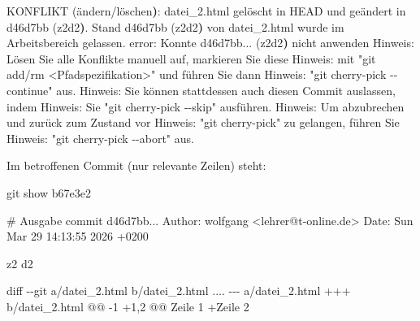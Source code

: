 \documentclass[
  ngerman,
  letterpaper,
  DIV=11]{scrreprt}
\newenvironment{Shaded}{\begin{snugshade}}{\end{snugshade}}
\newcommand{\AttributeTok}[1]{\textcolor[rgb]{0.40,0.45,0.13}{#1}}
\newcommand{\BuiltInTok}[1]{\textcolor[rgb]{0.00,0.23,0.31}{#1}}
\newcommand{\CommentTok}[1]{\textcolor[rgb]{0.37,0.37,0.37}{#1}}
\newcommand{\ErrorTok}[1]{\textcolor[rgb]{0.68,0.00,0.00}{#1}}
\newcommand{\ExtensionTok}[1]{\textcolor[rgb]{0.00,0.23,0.31}{#1}}
\newcommand{\FunctionTok}[1]{\textcolor[rgb]{0.28,0.35,0.67}{#1}}
\newcommand{\KeywordTok}[1]{\textcolor[rgb]{0.00,0.23,0.31}{\textbf{#1}}}
\newcommand{\NormalTok}[1]{\textcolor[rgb]{0.00,0.23,0.31}{#1}}
\newcommand{\OperatorTok}[1]{\textcolor[rgb]{0.37,0.37,0.37}{#1}}
\newcommand{\StringTok}[1]{\textcolor[rgb]{0.13,0.47,0.30}{#1}}
\begin{document}
\begin{Shaded}
\begin{Highlighting}[]
\ExtensionTok{KONFLIKT} \ErrorTok{(}\ExtensionTok{ändern/löschen}\KeywordTok{)}\BuiltInTok{:}\NormalTok{ datei\_2.html gelöscht in HEAD und }
\ExtensionTok{geändert}\NormalTok{ in d46d7bb }\ErrorTok{(}\ExtensionTok{z2d2}\KeywordTok{)}\BuiltInTok{.}\NormalTok{ Stand d46d7bb }\ErrorTok{(}\ExtensionTok{z2d2}\KeywordTok{)} \ExtensionTok{von}\NormalTok{ datei\_2.html }
\ExtensionTok{wurde}\NormalTok{ im Arbeitsbereich gelassen.}
\ExtensionTok{error:}\NormalTok{ Konnte d46d7bb... }\ErrorTok{(}\ExtensionTok{z2d2}\KeywordTok{)} \ExtensionTok{nicht}\NormalTok{ anwenden}
\ExtensionTok{Hinweis:}\NormalTok{ Lösen Sie alle Konflikte manuell auf, markieren Sie diese }
\ExtensionTok{Hinweis:}\NormalTok{ mit }\StringTok{"git add/rm \textless{}Pfadspezifikation\textgreater{}"}\NormalTok{ und führen Sie dann}
\ExtensionTok{Hinweis:} \StringTok{"git cherry{-}pick {-}{-}continue"}\NormalTok{ aus.}
\ExtensionTok{Hinweis:}\NormalTok{ Sie können stattdessen auch diesen Commit auslassen, indem}
\ExtensionTok{Hinweis:}\NormalTok{ Sie }\StringTok{"git cherry{-}pick {-}{-}skip"}\NormalTok{ ausführen.}
\ExtensionTok{Hinweis:}\NormalTok{ Um abzubrechen und zurück zum Zustand vor }
\ExtensionTok{Hinweis:} \StringTok{"git cherry{-}pick"}\NormalTok{ zu gelangen, führen Sie}
\ExtensionTok{Hinweis:}  \StringTok{"git cherry{-}pick {-}{-}abort"}\NormalTok{ aus.}
\end{Highlighting}
\end{Shaded}

Im betroffenen Commit (nur relevante Zeilen) steht:

\begin{Shaded}
\begin{Highlighting}[]
\FunctionTok{git}\NormalTok{ show b67e3e2}

\CommentTok{\# Ausgabe}
\ExtensionTok{commit}\NormalTok{ d46d7bb... }
\ExtensionTok{Author:}\NormalTok{ wolfgang }\OperatorTok{\textless{}}\NormalTok{lehrer@t{-}online.de}\OperatorTok{\textgreater{}}
\ExtensionTok{Date:}\NormalTok{   Sun Mar 29 14:13:55 2026 +0200}

    \ExtensionTok{z2}\NormalTok{ d2}

\FunctionTok{diff} \AttributeTok{{-}{-}git}\NormalTok{ a/datei\_2.html b/datei\_2.html}
\ExtensionTok{....}
\ExtensionTok{{-}{-}{-}}\NormalTok{ a/datei\_2.html}
\ExtensionTok{+++}\NormalTok{ b/datei\_2.html}
\ExtensionTok{@@} \AttributeTok{{-}1}\NormalTok{ +1,2 @@}
 \ExtensionTok{Zeile}\NormalTok{ 1}
\ExtensionTok{+Zeile}\NormalTok{ 2}
\end{Highlighting}
\end{Shaded}
\end{document}
